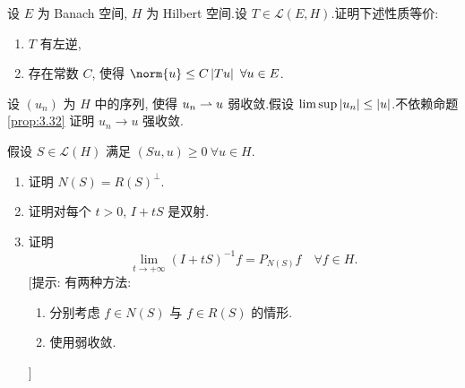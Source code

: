 \begin{exercise}
\label{exer:5.18}
设 $E$ 为 Banach 空间, $H$ 为 Hilbert 空间.设
$T\in\mathcal{L}(E,H)$.证明下述性质等价:
\begin{enumerate}[label=(\roman*), leftmargin=2.4em, itemsep=0.15em]
	\item $T$ 有左逆,
	\item 存在常数 $C$, 使得 $\norm{u}\le C\abs{Tu}\ \forall u\in E$.
\end{enumerate}
\end{exercise}

\begin{exercise}
\label{exer:5.19}
设 $(u_n)$ 为 $H$ 中的序列, 使得 $u_n\rightharpoonup u$ 弱收敛.假设
$\limsup\left|u_n\right|\le\left|u\right|$.不依赖命题  \ref{prop:3.32} 证明
$u_n\to u$ 强收敛.
\end{exercise}

\begin{exercise}
\label{exer:5.20}
假设 $S\in\mathcal{L}(H)$ 满足 $(Su,u)\ge0\ \forall u\in H$.
\begin{enumerate}[label=\arabic*., leftmargin=2.2em, itemsep=0.3em]
	\item 证明 $N(S)=R(S)^\perp$.
	\item 证明对每个 $t>0$, $I+tS$ 是双射.
	\item 证明
	      \begin{equation*}
	      \lim_{t\to+\infty}(I+tS)^{-1}f=P_{N(S)}f\quad\forall f\in H.
	      \end{equation*}
	      [提示: 有两种方法:
	      \begin{enumerate}[label=(\alph*), leftmargin=2.2em, itemsep=0.1em]
	      	\item 分别考虑 $f\in N(S)$ 与 $f\in R(S)$ 的情形.
	      	\item 使用弱收敛.
	      \end{enumerate}]
\end{enumerate}
\end{exercise}

